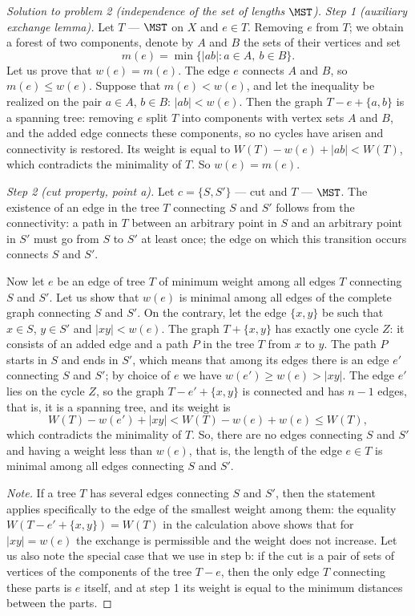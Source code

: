 \documentclass[a4paper,12pt]{report}
\begin{document}
\begin{proof}[Solution to problem \textup{2} \textup{(}independence of the set of lengths $\MST$\textup{)}]
\textit{Step \textup{1} \textup{(}auxiliary exchange lemma\textup{)}.} Let $T$ --- $\MST$ on $X$ and $e\in T$. Removing $e$ from $T$\textup{;} we obtain a forest of two components, denote by $A$ and $B$ the sets of their vertices and set
\[
m(e)=\min\bigl\{|ab|:a\in A,\ b\in B\bigr\}.
\]
Let us prove that $w(e)=m(e)$. The edge $e$ connects $A$ and $B$, so $m(e)\le w(e)$. Suppose that $m(e)<w(e)$, and let the inequality be realized on the pair $a\in A$, $b\in B$\textup{:} $|ab|<w(e)$. Then the graph $T-e+\{a,b\}$ is a spanning tree\textup{:} removing $e$ split $T$ into components with vertex sets $A$ and $B$, and the added edge connects these components, so no cycles have arisen and connectivity is restored. Its weight is equal to $W(T)-w(e)+|ab|<W(T)$, which contradicts the minimality of $T$. So $w(e)=m(e)$.

\textit{Step \textup{2} \textup{(}cut property, point \textup{a}\textup{)}.} Let $c=\{S,S'\}$ --- cut and $T$ --- $\MST$. The existence of an edge in the tree $T$ connecting $S$ and $S'$ follows from the connectivity\textup{:} a path in $T$ between an arbitrary point in $S$ and an arbitrary point in $S'$ must go from $S$ to $S'$ at least once\textup{;} the edge on which this transition occurs connects $S$ and $S'$.

Now let $e$ be an edge of tree $T$ of minimum weight among all edges $T$ connecting $S$ and $S'$. Let us show that $w(e)$ is minimal among all edges of the complete graph connecting $S$ and $S'$. On the contrary, let the edge $\{x,y\}$ be such that $x\in S$, $y\in S'$ and $|xy|<w(e)$. The graph $T+\{x,y\}$ has exactly one cycle $Z$\textup{:} it consists of an added edge and a path $P$ in the tree $T$ from $x$ to $y$. The path $P$ starts in $S$ and ends in $S'$, which means that among its edges there is an edge $e'$ connecting $S$ and $S'$\textup{;} by choice of $e$ we have $w(e')\ge w(e)>|xy|$. The edge $e'$ lies on the cycle $Z$, so the graph $T-e'+\{x,y\}$ is connected and has $n-1$ edges, that is, it is a spanning tree, and its weight is
\[
W(T)-w(e')+|xy|<W(T)-w(e)+w(e)\le W(T),
\]
which contradicts the minimality of $T$. So, there are no edges connecting $S$ and $S'$ and having a weight less than $w(e)$, that is, the length of the edge $e\in T$ is minimal among all edges connecting $S$ and $S'$.

\textit{Note.} If a tree $T$ has several edges connecting $S$ and $S'$, then the statement applies specifically to the edge of the smallest weight among them\textup{:} the equality $W(T-e'+\{x,y\})=W(T)$ in the calculation above shows that for $|xy|=w(e)$ the exchange is permissible and the weight does not increase. Let us also note the special case that we use in step \textup{b}\textup{:} if the cut is a pair of sets of vertices of the components of the tree $T-e$, then the only edge $T$ connecting these parts is $e$ itself, and at step \textup{1} its weight is equal to the minimum distances between the parts.


\end{proof}
\end{document}
